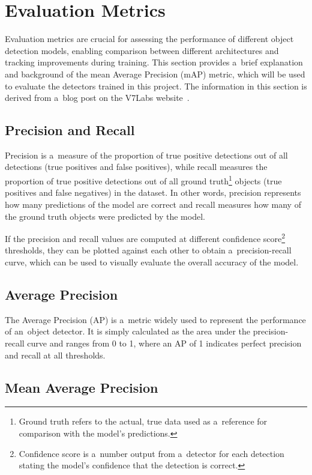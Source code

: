 \section{Evaluation Metrics}
\label{EvaluationMetrics}

Evaluation metrics are crucial for assessing the performance of different object
detection models, enabling comparison between different architectures and
tracking improvements during training. This section provides a~brief
explanation and background of the mean Average Precision (mAP) metric, which
will be used to evaluate the detectors trained in this project. The information
in this section is derived from a~blog post on the V7Labs website~\cite{mAP}.


\subsection*{Precision and Recall}

Precision is a~measure of the proportion of true positive detections out of all
detections (true positives and false positives), while recall measures the
proportion of true positive detections out of all ground truth\footnote{Ground
truth refers to the actual, true data used as a~reference for comparison with
the model's predictions.} objects (true positives and false negatives) in the
dataset. In other words, precision represents how many predictions of the model are
correct and recall measures how many of the ground truth objects were predicted
by the model.

If the precision and recall values are computed at different confidence
score\footnote{Confidence score is a~number output from a~detector for each
detection stating the model's confidence that the detection is correct.}
thresholds, they can be plotted against each other to obtain
a~precision-recall curve, which can be used to visually evaluate the overall
accuracy of the model.


\subsection*{Average Precision}

The Average Precision (AP) is a~metric widely used to represent the performance
of an~object detector. It is simply calculated as the area under the
precision-recall curve and ranges from 0 to 1, where an AP of 1 indicates
perfect precision and recall at all thresholds.


\subsection*{Mean Average Precision}

